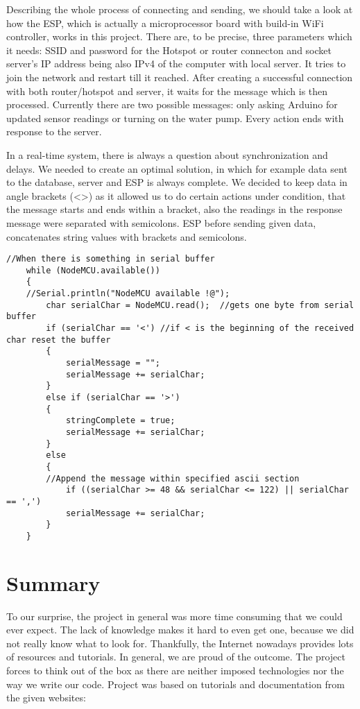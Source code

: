 \documentclass[oneside,a4paper,11pt]{report}
\begin{document}
\hspace{0.5cm}Describing the whole process of connecting and sending, we should take a look at how the ESP, which is actually a microprocessor board with build-in WiFi controller, works in this project. There are, to be precise, three parameters which it needs: SSID and password for the Hotspot or router connecton and socket server's IP address being also IPv4 of the computer with local server. It tries to join the network and restart till it reached. After creating a successful connection with both router/hotspot and server, it waits for the message which is then processed. Currently there are two possible messages: only asking Arduino for updated sensor readings or turning on the water pump. Every action ends with response to the server.\par
\hspace{0.5cm}In a real-time system, there is always a question about synchronization and delays. We needed to create an optimal solution, in which for example data sent to the database, server and ESP is always complete. We decided to keep data in angle brackets (<>) as it allowed us to do certain actions under condition, that the message starts and ends within a bracket, also the readings in the response message were separated with semicolons. ESP before sending given data, concatenates string values with brackets and semicolons.
\begin{lstlisting}[style=CStyle]
 //When there is something in serial buffer
	while (NodeMCU.available()) 
	{
	//Serial.println("NodeMCU available !@");
		char serialChar = NodeMCU.read();  //gets one byte from serial buffer
		if (serialChar == '<') //if < is the beginning of the received char reset the buffer
		{
			serialMessage = "";
			serialMessage += serialChar;
		}
		else if (serialChar == '>') 
		{
			stringComplete = true;
			serialMessage += serialChar;
		}
		else
		{
		//Append the message within specified ascii section 
			if ((serialChar >= 48 && serialChar <= 122) || serialChar == ',') 
			serialMessage += serialChar;
		}               
	}
\end{lstlisting}

\chapter{Summary}
\hspace{1cm}To our surprise, the project in general was more time consuming that we could ever expect. The lack of knowledge makes it hard to even get one, because we did not really know what to look for. Thankfully, the Internet nowadays provides lots of resources and tutorials. In general, we are proud of the outcome. The project forces to think out of the box as there are neither imposed technologies nor the way we write our code. Project was based on tutorials and documentation from the given websites: \cite{how2html}\cite{StackOverflow} \cite{schoolNODEJS}\cite{schoolHTML}\cite{schoolJS}\cite{schoolBOOTSTRAP}\cite{Sequelize}\cite{Devjs}\cite{Charts}\cite{Bootstrap}

\clearpage
{}
{}


\end{document}

